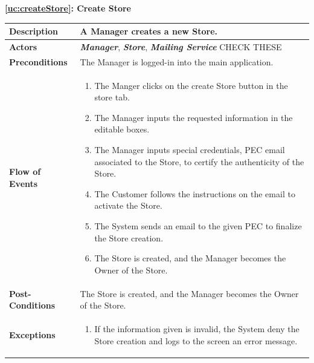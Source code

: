 \documentclass[a4paper, 10pt, oneside]{article}
\newcommand*{\lorenzo}[1]{\textcolor{BurntOrange}{#1}}
\begin{document}
\begin{center}
{\textbf{\ref{uc:createStore}: Create Store}}
\end{center}
\begin{tabularx}{\linewidth}{| l | X |}
	
	\hline
	\textbf{Description} & A Manager creates a new Store.\\
	

	\hline
	\textbf{Actors} & \textbf{\textit{Manager}}, \textit{\textbf{Store}}, \textit{\textbf{Mailing Service}}  \lorenzo{CHECK THESE}\\
	
	\hline
	\textbf{Preconditions} & The Manager is logged-in into the main application. \\
	
	\hline
	\textbf{Flow of Events} & \parbox{0.7\textwidth}{	
		\begin{enumerate}
			\item The Manger clicks on the create Store button in the store tab.
			\item The Manager inputs the requested information in the editable boxes.
			\item The Manager inputs special credentials, \lorenzo{PEC email associated to the Store}, to certify the authenticity of the Store.
			\item The Customer follows the instructions on the email to activate the Store.
			\item The System sends an email to the given PEC to finalize the Store creation.
			\item The Store is created, and the Manager becomes the Owner of the Store.
	\end{enumerate}}\\
	
	\hline
	\textbf{Post-Conditions} & The Store is created, and the Manager becomes the Owner of the Store.\\
	
	\hline
	\textbf{Exceptions} & \parbox{0.7\textwidth}{ \begin{enumerate}
			\item If the information given is invalid, the System deny the Store creation and logs to the screen an error message.
		\end{enumerate}}\\

	\hline
\end{tabularx}
\end{document}
